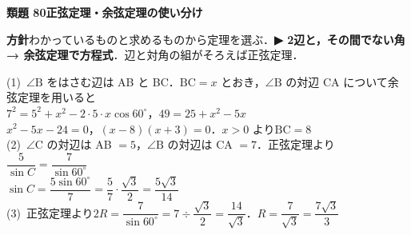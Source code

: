\documentclass[a4paper,11pt]{ltjsarticle}
\newcommand{\ans}[2]{\Needspace{5\baselineskip}\vspace{6pt}%
  {\sffamily\bfseries 類題 #1\quad #2}\par}
\newcommand{\point}[1]{\textsf{\bfseries ▶ #1}}
\begin{document}
\ans{80}{正弦定理・余弦定理の使い分け}
\begin{kai}
\textbf{方針}\quad わかっているものと求めるものから定理を選ぶ．\point{2辺と，その間でない角 → 余弦定理で方程式}．辺と対角の組がそろえば正弦定理．\\[2pt]
\begin{center}
\end{center}
(1)\ $\angle\mathrm B$ をはさむ辺は AB と BC．$\mathrm{BC}=x$ とおき，$\angle\mathrm B$ の対辺 CA について余弦定理を用いると\\
\hspace*{1.5em}$7^2=5^2+x^2-2\cdot5\cdot x\cos60^\circ$，\quad $49=25+x^2-5x$\\
\hspace*{1.5em}$x^2-5x-24=0$，\quad $(x-8)(x+3)=0$．$x>0$ より\quad $\mathrm{BC}=8$\\[2pt]
(2)\ $\angle\mathrm C$ の対辺は AB $=5$，$\angle\mathrm B$ の対辺は CA $=7$．正弦定理より\quad $\dfrac{5}{\sin C}=\dfrac{7}{\sin60^\circ}$\\[2pt]
\hspace*{1.5em}$\sin C=\dfrac{5\sin60^\circ}{7}=\dfrac{5}{7}\cdot\dfrac{\sqrt3}{2}=\dfrac{5\sqrt3}{14}$\\[2pt]
(3)\ 正弦定理より\quad $2R=\dfrac{7}{\sin60^\circ}=7\div\dfrac{\sqrt3}2=\dfrac{14}{\sqrt3}$．\quad $R=\dfrac{7}{\sqrt3}=\dfrac{7\sqrt3}{3}$
\end{kai}
\end{document}
